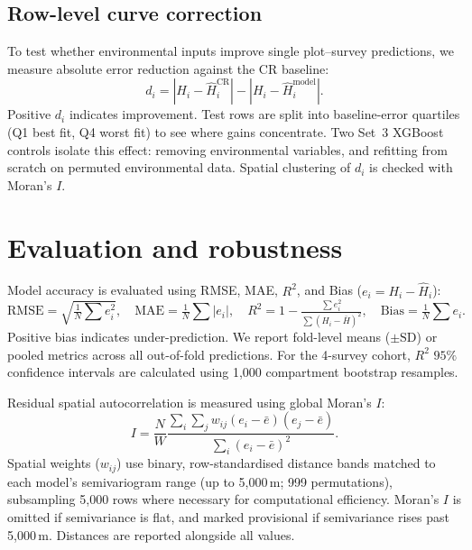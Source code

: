 \documentclass[logo,msc,ai]{infthesis}           %
\begin{document}
\subsection*{Row-level curve correction}
\label{sec:rq2a-method}
To test whether environmental inputs improve single plot--survey predictions, we measure absolute error reduction against the CR baseline:
\begin{equation}
d_i = \left|H_i-\hat H_i^{\mathrm{CR}}\right| - \left|H_i-\hat H_i^{\mathrm{model}}\right|.
\label{eq:residual-reduction}
\end{equation}
Positive $d_i$ indicates improvement. Test rows are split into baseline-error quartiles (Q1 best fit, Q4 worst fit) to see where gains concentrate. Two Set~3 XGBoost controls isolate this effect: removing environmental variables, and refitting from scratch on permuted environmental data. Spatial clustering of $d_i$ is checked with Moran's $I$.

\section{Evaluation and robustness}
\label{sec:eval-robustness}

Model accuracy is evaluated using RMSE, MAE, $R^2$, and Bias ($e_i = H_i - \hat H_i$):
\begin{equation}
\mathrm{RMSE}=\sqrt{\tfrac{1}{N}\textstyle\sum e_i^2}, \quad
\mathrm{MAE}=\tfrac{1}{N}\textstyle\sum |e_i|, \quad
R^2=1-\tfrac{\sum e_i^2}{\sum (H_i-\bar H)^2}, \quad
\mathrm{Bias}=\tfrac{1}{N}\textstyle\sum e_i.
\label{eq:eval-summary}
\end{equation}
Positive bias indicates under-prediction. We report fold-level means ($\pm\text{SD}$) or pooled metrics across all out-of-fold predictions. For the 4-survey cohort, $R^2$ $95\%$ confidence intervals are calculated using 1,000 compartment bootstrap resamples.

Residual spatial autocorrelation is measured using global Moran's $I$:
\begin{equation}
I=\frac{N}{W}\frac{\sum_i\sum_j w_{ij}(e_i-\bar e)(e_j-\bar e)}{\sum_i(e_i-\bar e)^2}.
\label{eq:morans-i}
\end{equation}
Spatial weights ($w_{ij}$) use binary, row-standardised distance bands matched to each model's semivariogram range (up to 5,000\,m; 999 permutations), subsampling 5,000 rows where necessary for computational efficiency. Moran's $I$ is omitted if semivariance is flat, and marked provisional if semivariance rises past 5,000\,m. Distances are reported alongside all values.
\end{document}
